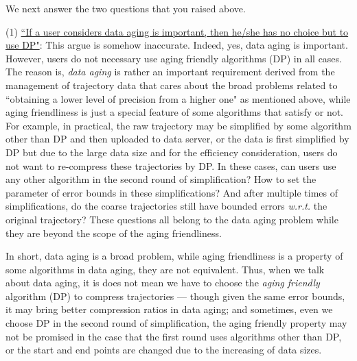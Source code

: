 \documentclass{letter}
\newcommand{\wrt}{\emph{w.r.t.}\xspace}
\begin{document}
We next answer the two questions that you raised above.



(1) \underline{``If a user considers data aging is important, then he/she has no choice but to use DP"}: This argue is somehow inaccurate. Indeed, yes, data aging is important. However, users do not necessary use aging friendly algorithms (DP) in all cases. The reason is,
\emph{data aging} is rather an important requirement derived from the management of trajectory data that cares about the broad problems related to ``obtaining a lower level of precision from a higher one" as mentioned above, while aging friendliness is just a special feature of some algorithms that satisfy or not. For example, in practical, the raw trajectory may be simplified by some algorithm other than DP and then uploaded to data server, or the data is first simplified by DP but due to the large data size and for the efficiency consideration, users do not want to re-compress these trajectories by DP. In these cases, can users use any other algorithm in the second round of simplification? How to set the parameter of error bounds in these simplifications? And after multiple times of simplifications, do the coarse trajectories still have bounded errors \wrt the original trajectory? These questions all belong to the data aging problem while they are beyond the scope of the aging friendliness.

In short, data aging is a broad problem, while aging friendliness is a property of some algorithms in data aging, they are not equivalent. Thus, when we talk about data aging, it is does not mean we have to choose the \emph{aging friendly} algorithm (DP) to compress trajectories --- though given the same error bounds, it may bring better compression ratios in data aging; and sometimes, even we choose DP in the second round of simplification, the aging friendly property may not be promised in the case that the first round uses algorithms other than DP, or the start and end points are changed due to the increasing of data sizes.
\end{document}
